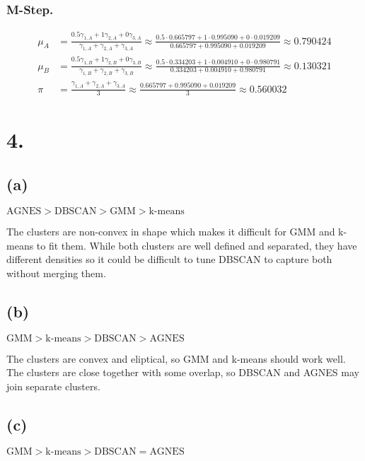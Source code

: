 \documentclass[12pt]{article}
\begin{document}
	\subsubsection*{M-Step.}

	\begin{align*}
		\mu_A &= \frac{0.5\gamma_{1,A}+1\gamma_{2,A}+0\gamma_{3,A}}{\gamma_{1,A}+\gamma_{2,A}+\gamma_{3,A}}
		\approx \frac{0.5 \cdot 0.665797+1\cdot 0.995090+0\cdot 0.019209}{0.665797+0.995090+0.019209} \approx 0.790424 \\
		\mu_B &= \frac{0.5\gamma_{1,B}+1\gamma_{2,B}+0\gamma_{3,B}}{\gamma_{1,B}+\gamma_{2,B}+\gamma_{3,B}}
		\approx \frac{0.5 \cdot 0.334203 + 1 \cdot 0.004910 + 0 \cdot 0.980791}{0.334203 + 0.004910 + 0.980791} \approx 0.130321 \\
		\pi &= \frac{\gamma_{1,A}+\gamma_{2,A}+\gamma_{3,A}}{3}\approx\frac{0.665797+0.995090+0.019209}{3}\approx0.560032
	\end{align*}

	\section*{4.}

	\subsection*{(a)}
	$\textrm{AGNES} > \textrm{DBSCAN} > \textrm{GMM} > \textrm{k-means}$

	The clusters are non-convex in shape which makes it difficult for GMM and k-means to fit them.
	While both clusters are well defined and separated, they have different densities so it could
	be difficult to tune DBSCAN to capture both without merging them.

	\subsection*{(b)}
	$\textrm{GMM} > \textrm{k-means} > \textrm{DBSCAN} > \textrm{AGNES}$
	
	The clusters are convex and eliptical, so GMM and k-means should work well. The clusters are
	close together with some overlap, so DBSCAN and AGNES may join separate clusters.

	\subsection*{(c)}
	$\textrm{GMM} > \textrm{k-means} > \textrm{DBSCAN} = \textrm{AGNES}$
\end{document}
